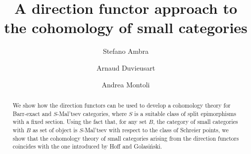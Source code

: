 \documentclass[11pt]{amsart}
\theoremstyle{plain}
\theoremstyle{definition}
\theoremstyle{remark}
\begin{document}
\title[A direction functor approach to the cohomology of small categories]{A direction functor approach to the cohomology of small categories}

\author[S.~Ambra]{Stefano Ambra}
\author[A.~Duvieusart]{Arnaud Duvieusart}
\author[A.~Montoli]{Andrea Montoli}


\address[Stefano Ambra]{Dipartimento di Matematica ``Federigo Enriques'', Universit\`{a} degli Studi di Milano, Via Saldini 50, 20133 Milano, Italy}
\address[Arnaud Duvieusart]{Institut de Recherche en Mathématique et Physique, Université catholique de Louvain, Chemin du Cyclotron 2, 1348 Louvain-la-Neuve, Belgium}
\address[Andrea Montoli]{Dipartimento di Matematica ``Federigo Enriques'', Universit\`{a} degli Studi di Milano, Via Saldini 50, 20133 Milano, Italy}


\begin{abstract}
We show how the direction functors can be used to develop a cohomology theory for Barr-exact and $S$-Mal'tsev categories, where $S$ is a suitable class of split epimorphisms with a fixed section. Using the fact that, for any set $B$, the category of small categories with $B$ as set of object is $S$-Mal'tsev with respect to the class of Schreier points, we show that the cohomology theory of small categories arising from the direction functors coincides with the one introduced by Hoff and Golasi\'{n}ski.
\end{abstract}


\maketitle	


\end{document}
